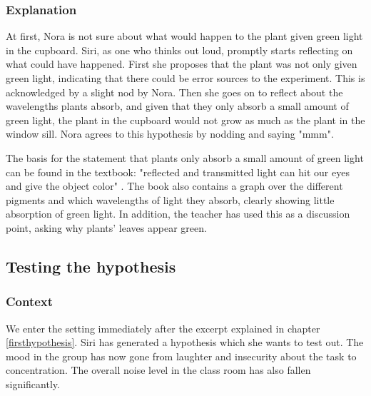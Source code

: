 \subsubsection*{Explanation}
At first, Nora is not sure about what would happen to the plant given green light in the cupboard. Siri, as one who thinks out loud, promptly starts reflecting on what could have happened. First she proposes that the plant was not only given green light, indicating that there could be error sources to the experiment. This is acknowledged by a slight nod by Nora. Then she goes on to reflect about the wavelengths plants absorb, and given that they only absorb a small amount of green light, the plant in the cupboard would not grow as much as the plant in the window sill. Nora agrees to this hypothesis by nodding and saying "mmm". 

The basis for the statement that plants only absorb a small amount of green light can be found in the textbook: "reflected and transmitted light can hit our eyes and give the object color" \citep[pg. 103]{bios}. The book also contains a graph over the different pigments and which wavelengths of light they absorb, clearly showing little absorption of green light. In addition, the teacher has used this as a discussion point, asking why plants' leaves appear green. 

\subsection{Testing the hypothesis}

\subsubsection*{Context}
We enter the setting immediately after the excerpt explained in chapter \ref{firsthypothesis}. Siri has generated a hypothesis which she wants to test out. The mood in the group has now gone from laughter and insecurity about the task to concentration. The overall noise level in the class room has also fallen significantly. 

